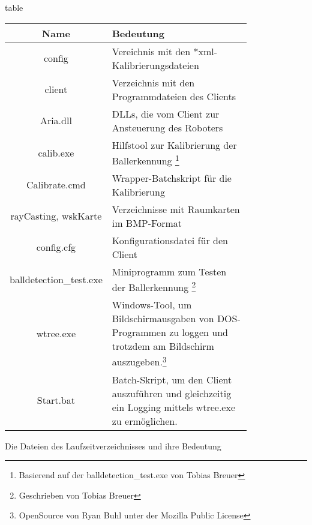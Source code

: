 \begin{nofloat}{table}{
      \centering
      \begin{tabular}{|c|p{0.8\linewidth}|}
        \hline 
        Name & Bedeutung \\ \hline
        config & Vereichnis mit den *xml-Kalibrierungsdateien\\ \hline
        client & Verzeichnis mit den Programmdateien des Clients\\ \hline
        Aria.dll & DLLs, die vom Client zur Ansteuerung
        des Roboters
        \\ \hline
        calib.exe & Hilfstool zur Kalibrierung der Ballerkennung
        \footnote{Basierend auf der balldetection\_test.exe von Tobias Breuer}\\ \hline
        Calibrate.cmd &  Wrapper-Batchskript für die Kalibrierung \\ \hline
        rayCasting,  wskKarte & Verzeichnisse mit Raumkarten im
        BMP-Format\\ \hline
        config.cfg & Konfigurationsdatei für den Client\\ \hline
        balldetection\_test.exe & Miniprogramm zum Testen der
        Ballerkennung \footnote{Geschrieben von Tobias Breuer}\\ \hline
        wtree.exe & Windows-Tool, um Bildschirmausgaben von
        DOS-Programmen zu loggen und trotzdem am Bildschirm
        auszugeben.\footnote{OpenSource von Ryan Buhl unter der
          Mozilla Public License}\\ \hline
        Start.bat & Batch-Skript, um den Client auszuführen und
        gleichzeitig ein Logging mittels wtree.exe zu ermöglichen.
       \\ \hline
      \end{tabular}
      \caption{Die Dateien des Laufzeitverzeichnisses und ihre Bedeutung}
      \label{bedeutung_namen}
}
\end{nofloat}

